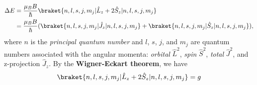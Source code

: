 \begin{align}
	\Delta E &= \frac{\mu_B B}{\hbar}\braket{n, l, s, j, m_j|\hat{L}_z + 2\hat{S}_z|n, l, s, j, m_j} \\
	&= \frac{\mu_B B}{\hbar} (\braket{n, l, s, j, m_j|\hat{J}_z|n, l, s, j, m_j} + \braket{n, l, s, j, m_j|\hat{S}_z|n, l, s, j, m_j}),
\end{align}
where $ n $ is the \textit{principal quantum number} and $ l $, $ s $, $ j $, and $ m_j $ are quantum numbers associated with the angular momenta: \textit{orbital} $ \hat{L}^2 $, \textit{spin} $ \hat{S}^2 $, \textit{total} $ \hat{J}^2 $, and z-projection $ \hat{J}_z $. By the \textbf{Wigner-Eckart theorem}, we have
\begin{equation}
	\braket{n, l, s, j, m_j|\hat{L}_z + 2\hat{S}_z|n, l, s, j, m_j} = g
\end{equation}
